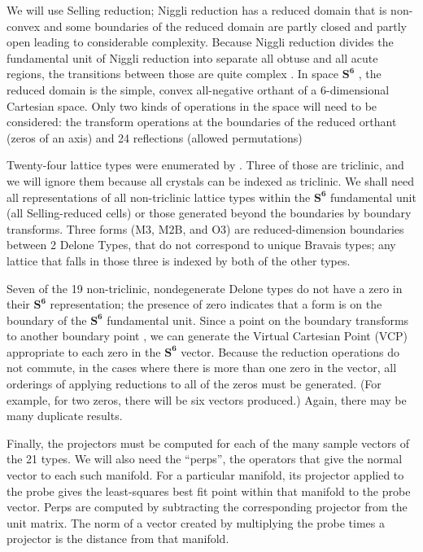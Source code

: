 \documentclass[preprint]{iucr}              %
\newcommand{\SVI}[0]{$\mathbf{S^{6}}$}
\begin{document}
	We will use Selling reduction; Niggli reduction has a reduced
	domain that is non-convex and some boundaries of the 
	reduced domain are partly closed and partly open \cite{andrews2014} leading 
	to considerable complexity. Because Niggli reduction divides the 
	fundamental unit of Niggli reduction into separate all obtuse and all acute regions, 
	the transitions between those are quite complex \cite{andrews2014}. 
	In space \SVI{} \cite{andrews2019b}, the reduced domain is the simple, convex all-negative orthant of a 6-dimensional 
	Cartesian space. Only two kinds of operations in the space 
	will need to be considered: the transform operations 
	at the boundaries of the reduced orthant (zeros of an axis) and 
	24 reflections (allowed permutations) \cite{andrews2019}
	
	Twenty-four lattice types were enumerated by . 
	Three of those are triclinic, and we will ignore them because all crystals 
	can be indexed as triclinic. We 
	shall need all representations of all non-triclinic lattice 
	types within the \SVI{} fundamental unit (all Selling-reduced 
	cells) or those generated beyond the boundaries by boundary transforms. 
	Three forms (M3, M2B, and O3) are reduced-dimension boundaries between 2 Delone Types, that do
	not correspond to unique Bravais types; any lattice that falls in those
	three is indexed by both of the other types.
	
	
	
	
	Seven of the 19 non-triclinic, nondegenerate Delone types do not have a zero in their \SVI{} 
	representation; the presence of zero indicates that a form is 
	on the boundary of the \SVI{} fundamental unit. Since a 
	point on the boundary transforms to another boundary 
	point \cite{andrews2019b}, we can generate the Virtual 
	Cartesian Point (VCP) \cite{andrews2019b} appropriate to 
	each zero in the \SVI{} vector. Because the reduction
	operations do not commute, in the cases where there is more 
	than one zero in the vector, all orderings of applying 
	reductions to all of the zeros must be generated. (For example, 
	for two zeros, there will be six vectors produced.) Again, 
	there may be many duplicate results. 
	
	Finally, the projectors must be computed for each of the many 
	sample vectors of the 21 types. We will also need the 
	``perps'', the operators that give the normal vector to each 
	such manifold. For a particular manifold, its projector 
	applied to the probe gives
	the least-squares best fit point within that manifold
	to the probe vector. 
	Perps are computed by subtracting the 
	corresponding projector from the unit matrix. The norm of a vector
	created by multiplying the probe times a projector
	 is the distance from that manifold.
	
\end{document}
